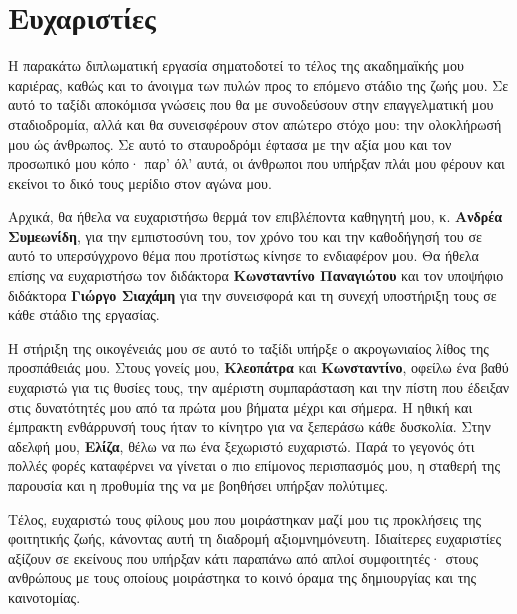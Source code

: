 \chapter*{Ευχαριστίες}

Η παρακάτω διπλωματική εργασία σηματοδοτεί το τέλος της ακαδημαϊκής μου
καριέρας, καθώς και το άνοιγμα των πυλών προς το επόμενο στάδιο της ζωής μου.
Σε αυτό το ταξίδι αποκόμισα γνώσεις που θα με συνοδεύσουν στην επαγγελματική
μου σταδιοδρομία, αλλά και θα συνεισφέρουν στον απώτερο στόχο μου: την
ολοκλήρωσή μου ώς άνθρωπος. Σε αυτό το σταυροδρόμι έφτασα με την αξία μου και
τον προσωπικό μου κόπο· παρ' όλ' αυτά, οι άνθρωποι που υπήρξαν πλάι μου φέρουν και
εκείνοι το δικό τους μερίδιο στον αγώνα μου.

Αρχικά, θα ήθελα να ευχαριστήσω θερμά τον επιβλέποντα καθηγητή μου, κ.
\textbf{Ανδρέα Συμεωνίδη}, για την εμπιστοσύνη του, τον χρόνο του και την
καθοδήγησή του σε αυτό το υπερσύγχρονο θέμα που προτίστως κίνησε το ενδιαφέρον
μου. Θα ήθελα επίσης να ευχαριστήσω τον διδάκτορα \textbf{Κωνσταντίνο
	Παναγιώτου} και τον υποψήφιο διδάκτορα \textbf{Γιώργο Σιαχάμη} για την
συνεισφορά και τη συνεχή υποστήριξη τους σε κάθε στάδιο της εργασίας.

Η στήριξη της οικογένειάς μου σε αυτό το ταξίδι υπήρξε ο ακρογωνιαίος λίθος της
προσπάθειάς μου. Στους γονείς μου, \textbf{Κλεοπάτρα} και \textbf{Κωνσταντίνο},
οφείλω ένα βαθύ ευχαριστώ για τις θυσίες τους, την αμέριστη συμπαράσταση και
την πίστη που έδειξαν στις δυνατότητές μου από τα πρώτα μου βήματα μέχρι και
σήμερα. Η ηθική και έμπρακτη ενθάρρυνσή τους ήταν το κίνητρο για να ξεπεράσω
κάθε δυσκολία. Στην αδελφή μου, \textbf{Ελίζα}, θέλω να πω ένα ξεχωριστό
ευχαριστώ. Παρά το γεγονός ότι πολλές φορές καταφέρνει να γίνεται ο πιο
επίμονος περισπασμός μου, η σταθερή της παρουσία και η προθυμία της να με
βοηθήσει υπήρξαν πολύτιμες.

Τέλος, ευχαριστώ τους φίλους μου που μοιράστηκαν μαζί μου τις προκλήσεις της
φοιτητικής ζωής, κάνοντας αυτή τη διαδρομή αξιομνημόνευτη. Ιδιαίτερες
ευχαριστίες αξίζουν σε εκείνους που υπήρξαν κάτι παραπάνω από απλοί
συμφοιτητές· στους ανθρώπους με τους οποίους μοιράστηκα το κοινό όραμα της
δημιουργίας και της καινοτομίας.
